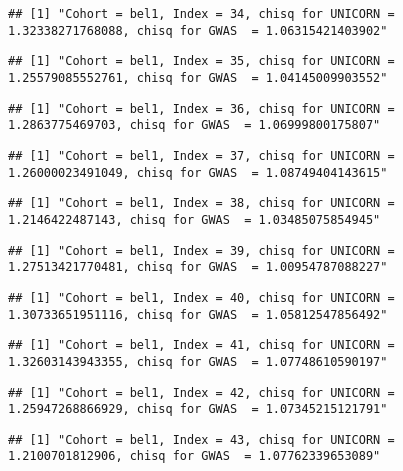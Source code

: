 \documentclass[]{article}
\begin{document}
\begin{verbatim}
## [1] "Cohort = bel1, Index = 34, chisq for UNICORN = 1.32338271768088, chisq for GWAS  = 1.06315421403902"
\end{verbatim}

\begin{verbatim}
## [1] "Cohort = bel1, Index = 35, chisq for UNICORN = 1.25579085552761, chisq for GWAS  = 1.04145009903552"
\end{verbatim}

\begin{verbatim}
## [1] "Cohort = bel1, Index = 36, chisq for UNICORN = 1.2863775469703, chisq for GWAS  = 1.06999800175807"
\end{verbatim}

\begin{verbatim}
## [1] "Cohort = bel1, Index = 37, chisq for UNICORN = 1.26000023491049, chisq for GWAS  = 1.08749404143615"
\end{verbatim}

\begin{verbatim}
## [1] "Cohort = bel1, Index = 38, chisq for UNICORN = 1.2146422487143, chisq for GWAS  = 1.03485075854945"
\end{verbatim}

\begin{verbatim}
## [1] "Cohort = bel1, Index = 39, chisq for UNICORN = 1.27513421770481, chisq for GWAS  = 1.00954787088227"
\end{verbatim}

\begin{verbatim}
## [1] "Cohort = bel1, Index = 40, chisq for UNICORN = 1.30733651951116, chisq for GWAS  = 1.05812547856492"
\end{verbatim}

\begin{verbatim}
## [1] "Cohort = bel1, Index = 41, chisq for UNICORN = 1.32603143943355, chisq for GWAS  = 1.07748610590197"
\end{verbatim}

\begin{verbatim}
## [1] "Cohort = bel1, Index = 42, chisq for UNICORN = 1.25947268866929, chisq for GWAS  = 1.07345215121791"
\end{verbatim}

\begin{verbatim}
## [1] "Cohort = bel1, Index = 43, chisq for UNICORN = 1.2100701812906, chisq for GWAS  = 1.07762339653089"
\end{verbatim}
\end{document}
